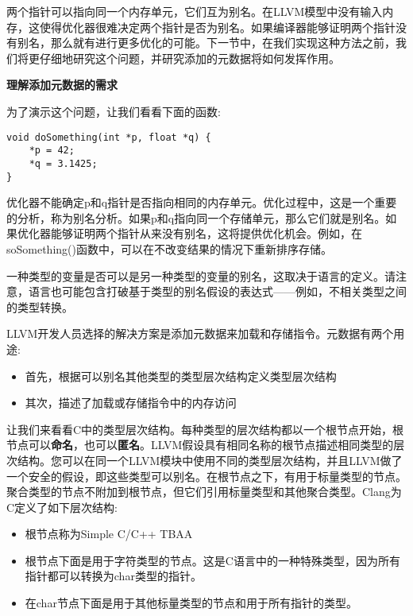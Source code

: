 两个指针可以指向同一个内存单元，它们互为别名。在LLVM模型中没有输入内存，这使得优化器很难决定两个指针是否为别名。如果编译器能够证明两个指针没有别名，那么就有进行更多优化的可能。下一节中，在我们实现这种方法之前，我们将更仔细地研究这个问题，并研究添加的元数据将如何发挥作用。\par

\hspace*{\fill} \par %
\textbf{理解添加元数据的需求}

为了演示这个问题，让我们看看下面的函数:\par

\begin{lstlisting}[caption={}]
void doSomething(int *p, float *q) {
	*p = 42;
	*q = 3.1425;
}
\end{lstlisting}

优化器不能确定p和q指针是否指向相同的内存单元。优化过程中，这是一个重要的分析，称为别名分析。如果p和q指向同一个存储单元，那么它们就是别名。如果优化器能够证明两个指针从来没有别名，这将提供优化机会。例如，在soSomething()函数中，可以在不改变结果的情况下重新排序存储。\par

一种类型的变量是否可以是另一种类型的变量的别名，这取决于语言的定义。请注意，语言也可能包含打破基于类型的别名假设的表达式——例如，不相关类型之间的类型转换。\par

LLVM开发人员选择的解决方案是添加元数据来加载和存储指令。元数据有两个用途:\par

\begin{itemize}
	\item 首先，根据可以别名其他类型的类型层次结构定义类型层次结构
	\item 其次，描述了加载或存储指令中的内存访问
\end{itemize}

让我们来看看C中的类型层次结构。每种类型的层次结构都以一个根节点开始，根节点可以\textbf{命名}，也可以\textbf{匿名}。LLVM假设具有相同名称的根节点描述相同类型的层次结构。您可以在同一个LLVM模块中使用不同的类型层次结构，并且LLVM做了一个安全的假设，即这些类型可以别名。在根节点之下，有用于标量类型的节点。聚合类型的节点不附加到根节点，但它们引用标量类型和其他聚合类型。Clang为C定义了如下层次结构:\par

\begin{itemize}
	\item 根节点称为Simple C/C++ TBAA
	\item 根节点下面是用于字符类型的节点。这是C语言中的一种特殊类型，因为所有指针都可以转换为char类型的指针。
	\item 在char节点下面是用于其他标量类型的节点和用于所有指针的类型。
\end{itemize}

